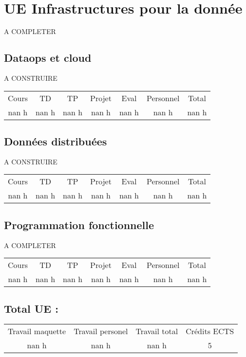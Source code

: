 \section{UE Infrastructures pour la donnée}%
\label{sec:UEInfrastructurespourladonne}%
A COMPLETER%
\subsection{Dataops et cloud}%
\label{subsec:Dataopsetcloud}%

%
A CONSTRUIRE%
\begin{longtable}{c c c c c c c}%
\hline%
Cours&TD&TP&Projet&Eval&Personnel&Total\\%
nan h&nan h&nan h&nan h&nan h&nan h&nan h\\%
\hline%
\end{longtable}%
\subsection{Données distribuées}%
\label{subsec:Donnesdistribues}%

%
A CONSTRUIRE%
\begin{longtable}{c c c c c c c}%
\hline%
Cours&TD&TP&Projet&Eval&Personnel&Total\\%
nan h&nan h&nan h&nan h&nan h&nan h&nan h\\%
\hline%
\end{longtable}%
\subsection{Programmation fonctionnelle}%
\label{subsec:Programmationfonctionnelle}%

%
A COMPLETER%
\begin{longtable}{c c c c c c c}%
\hline%
Cours&TD&TP&Projet&Eval&Personnel&Total\\%
nan h&nan h&nan h&nan h&nan h&nan h&nan h\\%
\hline%
\end{longtable}%
\subsection{Total UE :}%
\label{subsec:TotalUE}%

%
\begin{longtable}{c c c c}%
\hline%
Travail maquette&Travail personel&Travail total&Crédits ECTS\\%
nan h&nan h&nan h&5\\%
\hline%
\end{longtable}